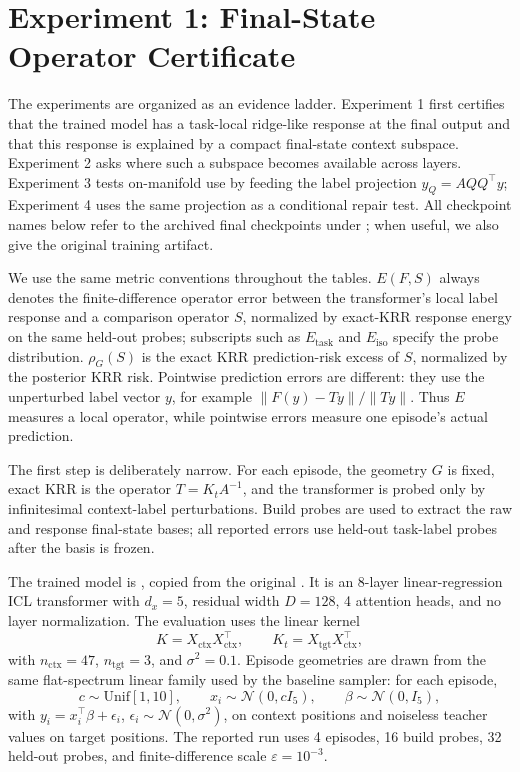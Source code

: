 \documentclass[11pt]{article}
\begin{document}
\section{Experiment 1: Final-State Operator Certificate}

The experiments are organized as an evidence ladder. Experiment 1 first certifies that the
trained model has a task-local ridge-like response at the final output and that this response is
explained by a compact final-state context subspace. Experiment 2 asks where such a subspace becomes
available across layers. Experiment 3 tests on-manifold use by feeding the label projection
\(y_Q=AQQ^\top y\); Experiment 4 uses the same projection as a conditional repair test.
All checkpoint names below refer to the archived final checkpoints under ;
when useful, we also give the original training artifact.

We use the same metric conventions throughout the tables. \(E(F,S)\) always denotes the
finite-difference operator error between the transformer's local label response and a comparison
operator \(S\), normalized by exact-KRR response energy on the same held-out probes; subscripts such
as \(E_{\mathrm{task}}\) and \(E_{\mathrm{iso}}\) specify the probe distribution. \(\rho_G(S)\) is
the exact KRR prediction-risk excess of \(S\), normalized by the posterior KRR risk. Pointwise
prediction errors are different: they use the unperturbed label vector \(y\), for example
\(\|F(y)-Ty\|/\|Ty\|\). Thus \(E\) measures a local operator, while pointwise errors measure one
episode's actual prediction.

The first step is deliberately narrow. For each episode, the geometry \(G\) is fixed, exact KRR is
the operator \(T=K_tA^{-1}\), and the transformer is probed only by infinitesimal context-label
perturbations. Build probes are used to extract the raw and response final-state bases; all reported
errors use held-out task-label probes after the basis is frozen.

The trained model is , copied from the original
. It is an 8-layer linear-regression ICL transformer with \(d_x=5\),
residual width \(D=128\), 4 attention heads, and no layer normalization. The evaluation uses the
linear kernel
\[
K=X_{\mathrm{ctx}}X_{\mathrm{ctx}}^\top,
\qquad
K_t=X_{\mathrm{tgt}}X_{\mathrm{ctx}}^\top,
\]
with \(n_{\mathrm{ctx}}=47\), \(n_{\mathrm{tgt}}=3\), and \(\sigma^2=0.1\). Episode geometries are
drawn from the same flat-spectrum linear family used by the baseline sampler: for each episode,
\[
c\sim\mathrm{Unif}[1,10],
\qquad
x_i\sim\mathcal{N}(0,cI_5),
\qquad
\beta\sim\mathcal{N}(0,I_5),
\]
with \(y_i=x_i^\top\beta+\epsilon_i\), \(\epsilon_i\sim\mathcal{N}(0,\sigma^2)\), on context
positions and noiseless teacher values on target positions. The reported run uses 4 episodes, 16
build probes, 32 held-out probes, and finite-difference scale \(\varepsilon=10^{-3}\).
\end{document}
